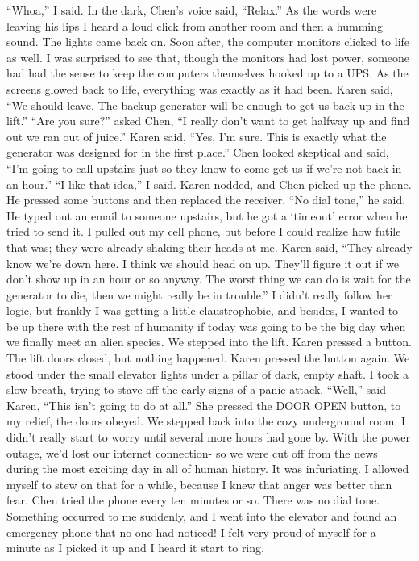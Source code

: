 \documentclass[a4paper]{article}
\begin{document}
“Whoa,” I said.
In the dark, Chen’s voice said, “Relax.”
As the words were leaving his lips I heard a loud click from another room and then a humming sound. The lights came back on. Soon after, the computer monitors clicked to life as well. I was surprised to see that, though the monitors had lost power, someone had had the sense to keep the computers themselves hooked up to a UPS. As the screens glowed back to life, everything was exactly as it had been.
Karen said, “We should leave. The backup generator will be enough to get us back up in the lift.”
“Are you sure?” asked Chen, “I really don’t want to get halfway up and find out we ran out of juice.”
Karen said, “Yes, I’m sure. This is exactly what the generator was designed for in the first place.”
Chen looked skeptical and said, “I’m going to call upstairs just so they know to come get us if we’re not back in an hour.”
“I like that idea,” I said.
Karen nodded, and Chen picked up the phone. He pressed some buttons and then replaced the receiver. “No dial tone,” he said.
He typed out an email to someone upstairs, but he got a ‘timeout’ error when he tried to send it. I pulled out my cell phone, but before I could realize how futile that was; they were already shaking their heads at me.
Karen said, “They already know we’re down here. I think we should head on up. They’ll figure it out if we don’t show up in an hour or so anyway. The worst thing we can do is wait for the generator to die, then we might really be in trouble.”
I didn’t really follow her logic, but frankly I was getting a little claustrophobic, and besides, I wanted to be up there with the rest of humanity if today was going to be the big day when we finally meet an alien species.
We stepped into the lift. Karen pressed a button. The lift doors closed, but nothing happened. Karen pressed the button again. We stood under the small elevator lights under a pillar of dark, empty shaft. I took a slow breath, trying to stave off the early signs of a panic attack.
“Well,” said Karen, “This isn’t going to do at all.”
She pressed the DOOR OPEN button, to my relief, the doors obeyed. We stepped back into the cozy underground room.
I didn’t really start to worry until several more hours had gone by. With the power outage, we’d lost our internet connection- so we were cut off from the news during the most exciting day in all of human history. It was infuriating. I allowed myself to stew on that for a while, because I knew that anger was better than fear.
Chen tried the phone every ten minutes or so. There was no dial tone.
Something occurred to me suddenly, and I went into the elevator and found an emergency phone that no one had noticed! I felt very proud of myself for a minute as I picked it up and I heard it start to ring.
\end{document}
